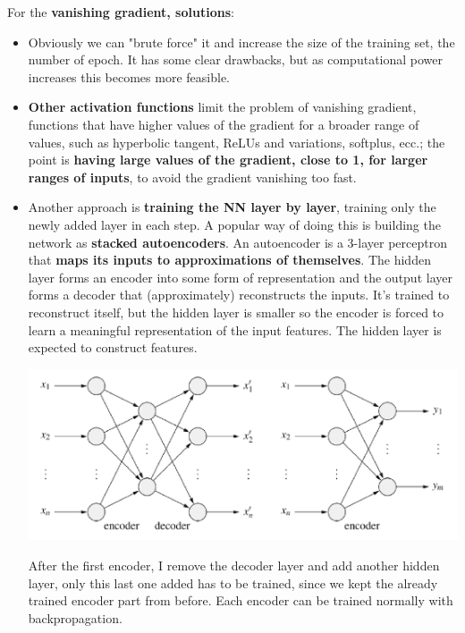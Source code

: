 \documentclass[11pt]{article}
\begin{document}
		For the \textbf{vanishing gradient, solutions}:
		\begin{itemize}
			\item Obviously we can "brute force" it and increase the size of the training set, the number of epoch. It has some clear drawbacks, but as computational power increases this becomes more feasible.\\
			
			\item \textbf{Other activation functions} limit the problem of vanishing gradient, functions that have higher values of the gradient for a broader range of values, such as hyperbolic tangent, ReLUs and variations, softplus, ecc.; the point is \textbf{having large values of the gradient, close to 1, for larger ranges of inputs}, to avoid the gradient vanishing too fast.\\
			
			\item Another approach is \textbf{training the NN layer by layer}, training only the newly added layer in each step. A popular way of doing this is building the network as \textbf{stacked autoencoders}. An autoencoder is a 3-layer perceptron that \textbf{maps its inputs to approximations of themselves}. The hidden layer forms an encoder into some form of representation and the output layer forms a decoder that (approximately) reconstructs the inputs. It's trained to reconstruct itself, but the hidden layer is smaller so the encoder is forced to learn a meaningful representation of the input features. The hidden layer is expected to construct features.
			\begin{center}
				\includegraphics[width=0.9\columnwidth]{img/NN/autoencoder}
			\end{center}
			After the first encoder, I remove the decoder layer and add another hidden layer, only this last one added has to be trained, since we kept the already trained encoder part from before. Each encoder can be trained normally with backpropagation.\\
			

\end{itemize}
\end{document}
